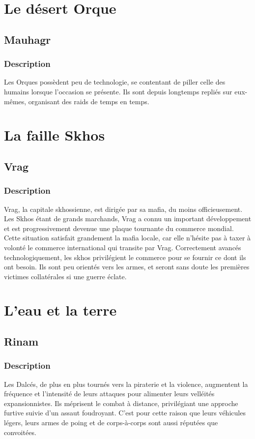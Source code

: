 \section{Le désert Orque}
\subsection{Mauhagr}
\subsubsection{Description}
Les Orques possèdent peu de technologie, se contentant de piller celle des humains lorsque l'occasion se présente. Ils sont depuis longtemps repliés sur eux-mêmes, organisant des raids de temps en temps.
\section{La faille Skhos}
\subsection{Vrag}
\subsubsection{Description}
Vrag, la capitale skhossienne, est dirigée par sa mafia, du moins officieusement. Les Skhos étant de grands marchands, Vrag a connu un important développement et est progressivement devenue une plaque tournante du commerce mondial. Cette situation satisfait grandement la mafia locale, car elle n'hésite pas à taxer à volonté le commerce international qui transite par Vrag. Correctement avancés technologiquement, les skhos privilégient le commerce pour se fournir ce dont ils ont besoin. Ils sont peu orientés vers les armes, et seront sans doute les premières victimes collatérales si une guerre éclate.
\section{L'eau et la terre}
\subsection{Rinam}
\subsubsection{Description}
Les Dalcés, de plus en plus tournés vers la piraterie et la violence, augmentent la fréquence et l'intensité de leurs attaques pour alimenter leurs velléités expansionnistes. Ils méprisent le combat à distance, privilégiant une approche furtive suivie d'un assaut foudroyant. C'est pour cette raison que leurs véhicules légers, leurs armes de poing et de corps-à-corps sont aussi réputées que convoitées.
